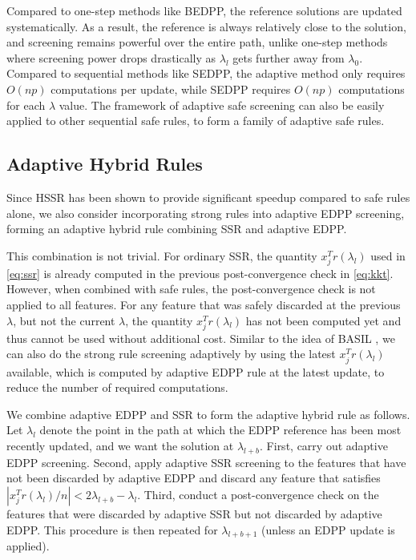 Compared to one-step methods like BEDPP, the reference solutions are updated systematically. As a result, the reference is always relatively close to the solution, and screening remains powerful over the entire path, unlike one-step methods where screening power drops drastically as $\lambda_l$ gets further away from $\lambda_0$. Compared to sequential methods like SEDPP, the adaptive method only requires $O(np)$ computations per update, while SEDPP requires $O(np)$ computations for each $\lambda$ value. The framework of adaptive safe screening can also be easily applied to other sequential safe rules, to form a family of adaptive safe rules.

\subsection{Adaptive Hybrid Rules}

Since HSSR \citep{Zeng2021} has been shown to provide significant speedup compared to safe rules alone, we also consider incorporating strong rules into adaptive EDPP screening, forming an adaptive hybrid rule combining SSR and adaptive EDPP.

This combination is not trivial. For ordinary SSR, the quantity $x_j^Tr(\lambda_l)$ used in \eqref{eq:ssr} is already computed in the previous post-convergence check in \eqref{eq:kkt}. However, when combined with safe rules, the post-convergence check is not applied to all features. For any feature that was safely discarded at the previous $\lambda$, but not the current $\lambda$, the quantity $x_j^Tr(\lambda_l)$ has not been computed yet and thus cannot be used without additional cost. Similar to the idea of BASIL \citep{qian2019fast}, we can also do the strong rule screening adaptively by using the latest $x_j^Tr(\lambda_l)$ available, which is computed by adaptive EDPP rule at the latest update, to reduce the number of required computations.

We combine adaptive EDPP and SSR to form the adaptive hybrid rule as follows. Let $\lambda_l$ denote the point in the path at which the EDPP reference has been most recently updated, and we want the solution at $\lambda_{l+b}$. First, carry out adaptive EDPP screening. Second, apply adaptive SSR screening to the features that have not been discarded by adaptive EDPP and discard any feature that satisfies $|x_j^Tr(\lambda_l)/n|<2\lambda_{l+b}-\lambda_l$. Third, conduct a post-convergence check on the features that were discarded by adaptive SSR but not discarded by adaptive EDPP. This procedure is then repeated for $\lambda_{l+b+1}$ (unless an EDPP update is applied).

